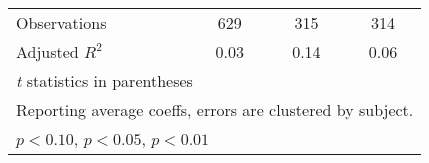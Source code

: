 \begin{table}[htbp]
\begin{tabular}{l*{3}{c}}
\hline
Observations    &      629         &      315         &      314         \\
Adjusted \(R^{2}\)&     0.03         &     0.14         &     0.06         \\
\hline\hline
\multicolumn{4}{l}{\footnotesize \textit{t} statistics in parentheses}\\
\multicolumn{4}{l}{\footnotesize Reporting average coeffs, errors are clustered by subject.}\\
\multicolumn{4}{l}{\footnotesize \sym{*} \(p<0.10\), \sym{**} \(p<0.05\), \sym{***} \(p<0.01\)}\\
\end{tabular}
\end{table}

